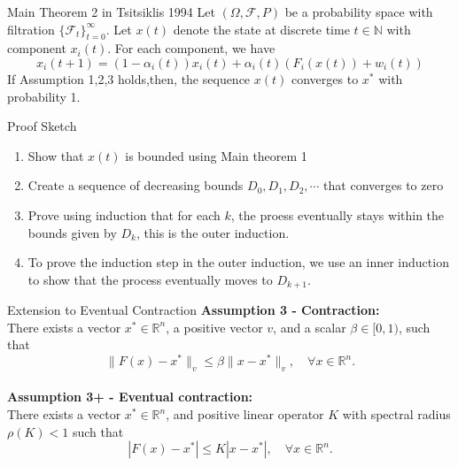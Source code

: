 \documentclass[aspectratio=169]{beamer} %
\begin{document}
\begin{frame}{Main Theorem 2 in Tsitsiklis 1994}
Let $(\Omega, \mathcal{F},P)$ be a probability space with filtration $\{\mathcal{F}_t\}_{t=0}^\infty$. Let $x(t)$ denote the state at discrete time $t\in\mathbb{N}$ with component $x_i(t)$. For each component, we have
$$
x_i(t+1) = (1-\alpha_i(t))x_i(t) + \alpha_i(t)(F_i(x(t)) + w_i(t)) 
$$
If Assumption 1,2,3 holds,then, the sequence $x(t)$ converges to $x^*$ with probability 1.
    
\end{frame}
\begin{frame}{Proof Sketch}
\begin{enumerate}
    \item Show that $x(t)$ is bounded using Main theorem 1
    \item Create a sequence of decreasing bounds $D_0, D_1, D_2,\cdots$ that converges to zero
    \item Prove using induction that for each $k$, the proess eventually stays within the bounds given by $D_k$, this is the outer induction.
    \item To prove the induction step in the outer induction, we use an inner induction to show that the process eventually moves to $D_{k+1}$.
\end{enumerate}
    
\end{frame}

\begin{frame}{Extension to Eventual Contraction}
\textbf{Assumption 3 - Contraction:}\\
There exists a vector $x^* \in \mathbb{R}^n$, a positive vector $v$, and a scalar $\beta \in [0,1)$, such that\\
\begin{equation}
\|F(x) - x^*\|_v \leq \beta \|x - x^*\|_v, \quad \forall x \in \mathbb{R}^n.
\end{equation}
\\
\textbf{Assumption 3+ - Eventual contraction:}\\
There exists a vector $x^* \in \mathbb{R}^n$, and positive linear operator $K$ with spectral radius $\rho(K)<1$ such that
\begin{equation}
|F(x) - x^*|\leq K|x - x^*|, \quad \forall x \in \mathbb{R}^n.
\end{equation}
    
\end{frame}
\end{document}
